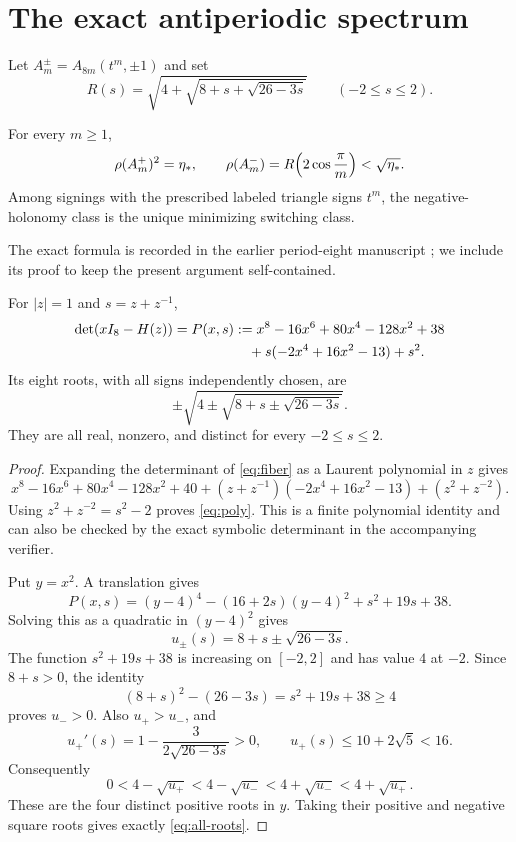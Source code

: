 \section{The exact antiperiodic spectrum}

Let $A_m^\pm=A_{8m}(t^m,\pm1)$ and set
\[
 R(s)=\sqrt{4+\sqrt{8+s+\sqrt{26-3s}}}\qquad(-2\le s\le2).
\]
\begin{theorem}\label{thm:period8}
For every $m\ge1$,
\begin{equation}
 \rho(A_m^+)^2=\eta_*,
 \qquad \rho(A_m^-)=R\!\left(2\cos\frac\pi m\right)<\sqrt{\eta_*}.
 \label{eq:main}
\end{equation}
Among signings with the prescribed labeled triangle signs $t^m$, the
negative-holonomy class is the unique minimizing switching class.
\end{theorem}
The exact formula is recorded in the earlier period-eight manuscript
\cite{EarlierPeriodEight}; we include its proof to keep the present
argument self-contained.

\begin{lemma}\label{lem:poly}
For $|z|=1$ and $s=z+z^{-1}$,
\begin{align}
 \det(xI_8-H(z))=P(x,s)
  &:=x^8-16x^6+80x^4-128x^2+38 \notag\\
  &\quad+s(-2x^4+16x^2-13)+s^2.
 \label{eq:poly}
\end{align}
Its eight roots, with all signs independently chosen, are
\begin{equation}
 \pm\sqrt{4\pm\sqrt{8+s\pm\sqrt{26-3s}}}.
 \label{eq:all-roots}
\end{equation}
They are all real, nonzero, and distinct for every $-2\le s\le2$.
\end{lemma}
\begin{proof}
Expanding the determinant of \eqref{eq:fiber} as a Laurent polynomial
in $z$ gives
\[
 x^8-16x^6+80x^4-128x^2+40
 +(z+z^{-1})(-2x^4+16x^2-13)+(z^2+z^{-2}).
\]
Using $z^2+z^{-2}=s^2-2$ proves \eqref{eq:poly}.
This is a finite polynomial identity and can also be checked by the exact
symbolic determinant in the accompanying verifier.

Put $y=x^2$. A translation gives
\begin{equation}
 P(x,s)=(y-4)^4-(16+2s)(y-4)^2+s^2+19s+38.
 \label{eq:centered}
\end{equation}
Solving this as a quadratic in $(y-4)^2$ gives
\[
 u_\pm(s)=8+s\pm\sqrt{26-3s}.
\]
The function $s^2+19s+38$ is increasing on $[-2,2]$ and has value $4$
at $-2$. Since $8+s>0$, the identity
\[
 (8+s)^2-(26-3s)=s^2+19s+38\ge4
\]
proves $u_->0$. Also $u_+>u_-$, and
\[
 u_+'(s)=1-\frac3{2\sqrt{26-3s}}>0,
 \qquad u_+(s)\le10+2\sqrt5<16.
\]
Consequently
\[
 0<4-\sqrt{u_+}<4-\sqrt{u_-}
   <4+\sqrt{u_-}<4+\sqrt{u_+}.
\]
These are the four distinct positive roots in $y$. Taking their positive
and negative square roots gives exactly \eqref{eq:all-roots}.
\end{proof}

